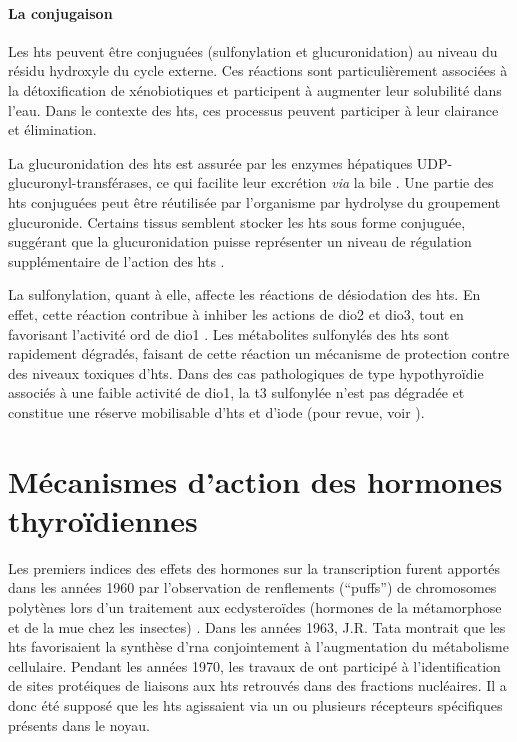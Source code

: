 \documentclass[../main.tex]{subfiles}
\begin{document}
\paragraph{La conjugaison}
Les \glspl{ht} peuvent être conjuguées (sulfonylation et glucuronidation) au niveau du résidu hydroxyle du cycle externe.
Ces réactions sont particulièrement associées à la détoxification de xénobiotiques et participent à augmenter leur solubilité dans l'eau.
Dans le contexte des \glspl{ht}, ces processus peuvent participer à leur clairance et élimination.
\par
La glucuronidation des \glspl{ht} est assurée par les enzymes hépatiques UDP-glucuronyl-transférases, ce qui facilite leur excrétion \textit{via} la bile \citep{Visser1996}.
Une partie des \glspl{ht} conjuguées peut être réutilisée par l'organisme par hydrolyse du groupement glucuronide.
Certains tissus semblent stocker les \glspl{ht} sous forme conjuguée, suggérant que la glucuronidation puisse représenter un niveau de régulation supplémentaire de l'action des \glspl{ht} \citep{VanderHeide2007}.
\par
La sulfonylation, quant à elle, affecte les réactions de désiodation des \glspl{ht}.
En effet, cette réaction contribue à inhiber les actions de \gls{dio2} et \gls{dio3}, tout en favorisant l'activité \gls{ord} de \gls{dio1} \citep{Visser1990}.
Les métabolites sulfonylés des \glspl{ht} sont rapidement dégradés, faisant de cette réaction un mécanisme de protection contre des niveaux toxiques d'\glspl{ht}.
Dans des cas pathologiques de type hypothyroïdie associés à une faible activité de \gls{dio1}, la \gls{t3} sulfonylée n'est pas dégradée et constitue une réserve mobilisable d'\glspl{ht} et d'iode (pour revue, voir \citealp{Visser1994}).





\section{Mécanismes d'action des hormones thyroïdiennes}

Les premiers indices des effets des hormones sur la transcription furent apportés dans les années 1960 par l'observation de renflements (``puffs'') de chromosomes polytènes lors d'un traitement aux ecdysteroïdes (hormones de la métamorphose et de la mue chez les insectes) \citep{Clever1960}.
Dans les années 1963, J.R. Tata montrait que les \glspl{ht} favorisaient la synthèse d'\gls{rna} conjointement à l'augmentation du métabolisme cellulaire.
Pendant les années 1970, les travaux de \citet{Samuels1973} ont participé à l'identification de sites protéiques de liaisons aux \glspl{ht} retrouvés dans des fractions nucléaires. Il a donc été supposé que les \glspl{ht} agissaient via un ou plusieurs récepteurs spécifiques présents dans le noyau.
\end{document}

